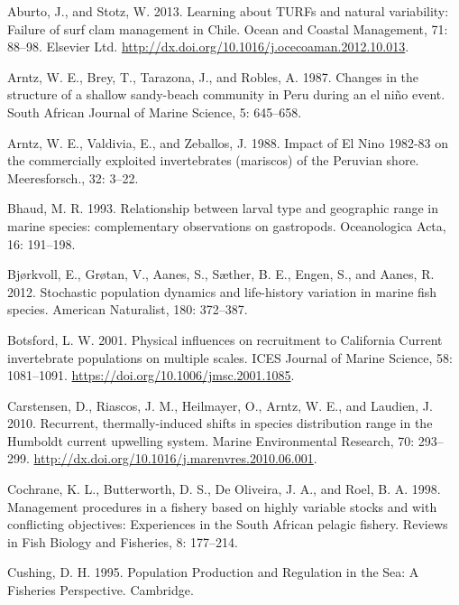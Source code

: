 \documentclass[12pt]{article}
\begin{document}
\leavevmode\hypertarget{ref-Aburto2013a}{}%
Aburto, J., and Stotz, W. 2013. Learning about TURFs and natural
variability: Failure of surf clam management in Chile. Ocean and Coastal
Management, 71: 88--98. Elsevier Ltd.
\url{http://dx.doi.org/10.1016/j.ocecoaman.2012.10.013}.

\leavevmode\hypertarget{ref-Arntz1987}{}%
Arntz, W. E., Brey, T., Tarazona, J., and Robles, A. 1987. Changes in
the structure of a shallow sandy-beach community in Peru during an el
niño event. South African Journal of Marine Science, 5: 645--658.

\leavevmode\hypertarget{ref-Arntz1988}{}%
Arntz, W. E., Valdivia, E., and Zeballos, J. 1988. Impact of El Nino
1982-83 on the commercially exploited invertebrates (mariscos) of the
Peruvian shore. Meeresforsch., 32: 3--22.

\leavevmode\hypertarget{ref-Bhaud1993}{}%
Bhaud, M. R. 1993. Relationship between larval type and geographic range
in marine species: complementary observations on gastropods.
Oceanologica Acta, 16: 191--198.

\leavevmode\hypertarget{ref-Bjorkvoll2012}{}%
Bjørkvoll, E., Grøtan, V., Aanes, S., Sæther, B. E., Engen, S., and
Aanes, R. 2012. Stochastic population dynamics and life-history
variation in marine fish species. American Naturalist, 180: 372--387.

\leavevmode\hypertarget{ref-Botsford2001}{}%
Botsford, L. W. 2001. Physical influences on recruitment to California
Current invertebrate populations on multiple scales. ICES Journal of
Marine Science, 58: 1081--1091.
\url{https://doi.org/10.1006/jmsc.2001.1085}.

\leavevmode\hypertarget{ref-Carstensen2010}{}%
Carstensen, D., Riascos, J. M., Heilmayer, O., Arntz, W. E., and
Laudien, J. 2010. Recurrent, thermally-induced shifts in species
distribution range in the Humboldt current upwelling system. Marine
Environmental Research, 70: 293--299.
\url{http://dx.doi.org/10.1016/j.marenvres.2010.06.001}.

\leavevmode\hypertarget{ref-Cochrane1998}{}%
Cochrane, K. L., Butterworth, D. S., De Oliveira, J. A., and Roel, B. A.
1998. Management procedures in a fishery based on highly variable stocks
and with conflicting objectives: Experiences in the South African
pelagic fishery. Reviews in Fish Biology and Fisheries, 8: 177--214.

\leavevmode\hypertarget{ref-Cushing1995}{}%
Cushing, D. H. 1995. Population Production and Regulation in the Sea: A
Fisheries Perspective. Cambridge.
\end{document}
